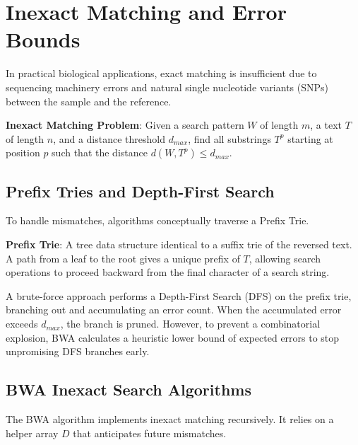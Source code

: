 \documentclass{article}
\begin{document}
\section{Inexact Matching and Error Bounds}
In practical biological applications, exact matching is insufficient due to sequencing machinery errors and natural single nucleotide variants (SNPs) between the sample and the reference.

\begin{important}
    \textbf{Inexact Matching Problem}: Given a search pattern $W$ of length $m$, a text $T$ of length $n$, and a distance threshold $d_{max}$, find all substrings $T^p$ starting at position $p$ such that the distance $d(W, T^p) \leq d_{max}$.
\end{important}

\subsection{Prefix Tries and Depth-First Search}
To handle mismatches, algorithms conceptually traverse a Prefix Trie.


\begin{important}
    \textbf{Prefix Trie}: A tree data structure identical to a suffix trie of the reversed text. A path from a leaf to the root gives a unique prefix of $T$, allowing search operations to proceed backward from the final character of a search string.
\end{important}

A brute-force approach performs a Depth-First Search (DFS) on the prefix trie, branching out and accumulating an error count. When the accumulated error exceeds $d_{max}$, the branch is pruned. However, to prevent a combinatorial explosion, BWA calculates a heuristic lower bound of expected errors to stop unpromising DFS branches early.

\subsection{BWA Inexact Search Algorithms}
The BWA algorithm implements inexact matching recursively. It relies on a helper array $D$ that anticipates future mismatches.
\end{document}
